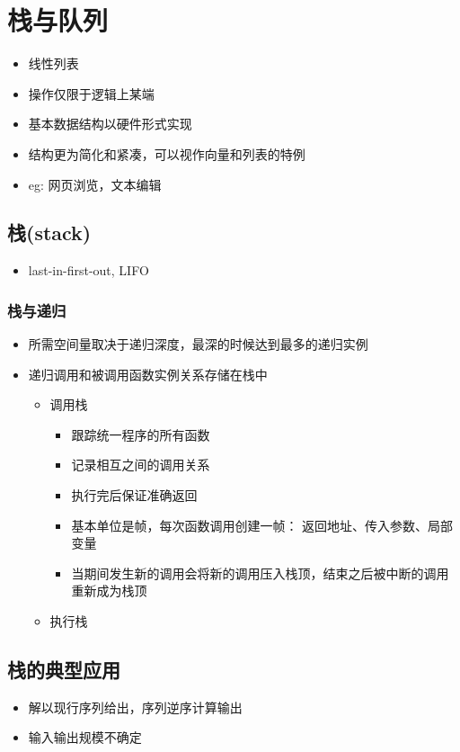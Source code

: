 \chapter{栈与队列}
\begin{itemize}
\item 线性列表
\item 操作仅限于逻辑上某端
\item 基本数据结构以硬件形式实现
\item 结构更为简化和紧凑，可以视作向量和列表的特例
\item eg: 网页浏览，文本编辑
\end{itemize}

\section{栈(stack)}
\begin{itemize}
\item last-in-first-out, LIFO
\end{itemize}

\subsection{栈与递归}
\begin{itemize}
\item 所需空间量取决于递归深度，最深的时候达到最多的递归实例
\item 递归调用和被调用函数实例关系存储在栈中
\begin{itemize}
\item 调用栈
\begin{itemize}
\item 跟踪统一程序的所有函数
\item 记录相互之间的调用关系
\item 执行完后保证准确返回
\item 基本单位是帧，每次函数调用创建一帧： 返回地址、传入参数、局部变量
\item 当期间发生新的调用会将新的调用压入栈顶，结束之后被中断的调用重新成为栈顶
\end{itemize}
\item 执行栈
\end{itemize}
\end{itemize}

\section{栈的典型应用}
\begin{itemize}
\item 解以现行序列给出，序列逆序计算输出
\item 输入输出规模不确定
\end{itemize}

